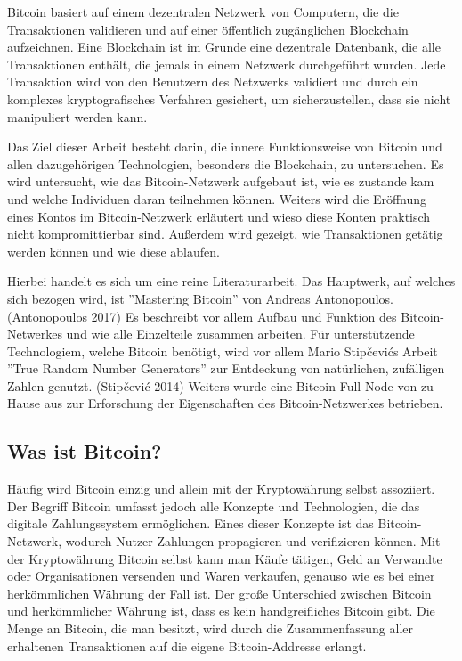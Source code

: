 Bitcoin basiert auf einem dezentralen Netzwerk von Computern, die die Transaktionen validieren und auf einer öffentlich 
zugänglichen Blockchain aufzeichnen. Eine Blockchain ist im Grunde eine dezentrale Datenbank, die alle Transaktionen enthält, 
die jemals in einem Netzwerk durchgeführt wurden. Jede Transaktion wird von den Benutzern des Netzwerks validiert und durch ein 
komplexes kryptografisches Verfahren gesichert, um sicherzustellen, dass sie nicht manipuliert werden kann.

Das Ziel dieser Arbeit besteht darin, die innere Funktionsweise von Bitcoin und allen dazugehörigen Technologien, besonders die
Blockchain, zu untersuchen. Es wird untersucht, wie das Bitcoin-Netzwerk aufgebaut ist, wie es zustande kam und welche
Individuen daran teilnehmen können. Weiters wird die Eröffnung eines Kontos im Bitcoin-Netzwerk erläutert und wieso diese Konten 
praktisch nicht kompromittierbar sind. Außerdem wird gezeigt, wie Transaktionen getätig werden können und wie diese ablaufen.

Hierbei handelt es sich um eine reine Literaturarbeit. Das Hauptwerk, auf welches sich bezogen wird, ist ''Mastering Bitcoin''
von Andreas Antonopoulos. (Antonopoulos 2017) Es beschreibt vor allem Aufbau und Funktion des Bitcoin-Netwerkes und wie 
alle Einzelteile zusammen arbeiten. Für unterstützende Technologiem, welche Bitcoin benötigt, wird vor allem Mario Stipčevićs
Arbeit ''True Random Number Generators'' zur Entdeckung von natürlichen, zufälligen Zahlen genutzt. (Stipčević 2014) Weiters
wurde eine Bitcoin-Full-Node von zu Hause aus zur Erforschung der Eigenschaften des Bitcoin-Netzwerkes betrieben.

\subsection{Was ist Bitcoin?}
Häufig wird Bitcoin einzig und allein mit der Kryptowährung selbst assoziiert. Der Begriff Bitcoin umfasst jedoch alle 
Konzepte und Technologien, die das digitale Zahlungssystem ermöglichen.  Eines dieser Konzepte ist das Bitcoin-Netzwerk, wodurch
Nutzer Zahlungen propagieren und verifizieren können. Mit der Kryptowährung Bitcoin selbst kann man Käufe tätigen, Geld an 
Verwandte oder Organisationen versenden und Waren verkaufen, genauso wie es bei einer herkömmlichen Währung der Fall ist. Der 
große Unterschied zwischen Bitcoin und herkömmlicher Währung ist, dass es kein handgreifliches Bitcoin gibt. Die Menge an 
Bitcoin, die man besitzt, wird durch die Zusammenfassung aller erhaltenen Transaktionen auf die eigene Bitcoin-Addresse erlangt. 

